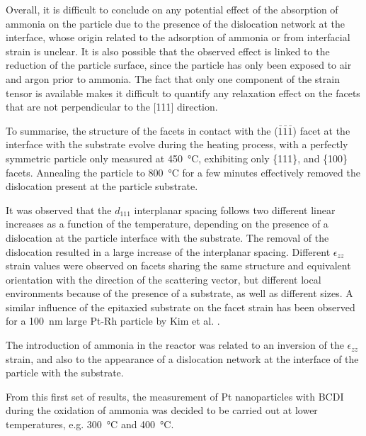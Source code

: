 Overall, it is difficult to conclude on any potential effect of the absorption of ammonia on the particle due to the presence of the dislocation network at the interface, whose origin related to the adsorption of ammonia or from interfacial strain is unclear.
It is also possible that the observed effect is linked to the reduction of the particle surface, since the particle has only been exposed to air and argon prior to ammonia.
The fact that only one component of the strain tensor is available makes it difficult to quantify any relaxation effect on the facets that are not perpendicular to the [111] direction.

To summarise, the structure of the facets in contact with the ($\bar{1}\bar{1}\bar{1}$) facet at the interface with the substrate evolve during the heating process, with a perfectly symmetric particle only measured at \qty{450}{\degreeCelsius}, exhibiting only \{111\}, and \{100\} facets.
Annealing the particle to \qty{800}{\degreeCelsius} for a few minutes effectively removed the dislocation present at the particle substrate.

It was observed that the $d_{111}$ interplanar spacing follows two different linear increases as a function of the temperature, depending on the presence of a dislocation at the particle interface with the substrate.
The removal of the dislocation resulted in a large increase of the interplanar spacing.
Different $\epsilon_{zz}$ strain values were observed on facets sharing the same structure and equivalent orientation with the direction of the scattering vector, but different local environments because of the presence of a substrate, as well as different sizes.
A similar influence of the epitaxied substrate on the facet strain has been observed for a \qty{100}{\nm} large Pt-Rh particle by Kim et al. \parencite*{Kim2021}.

The introduction of ammonia in the reactor was related to an inversion of the $\epsilon_{zz}$ strain, and also to the appearance of a dislocation network at the interface of the particle with the substrate.

From this first set of results, the measurement of Pt nanoparticles with BCDI during the oxidation of ammonia was decided to be carried out at lower temperatures, e.g. \qty{300}{\degreeCelsius} and \qty{400}{\degreeCelsius}.
